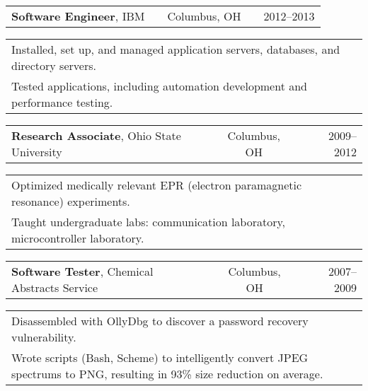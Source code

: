 \documentclass[12pt]{report}
\renewcommand{\bullet}{$\vcenter{\hbox{~\huge$\cdot$~}}$}
\begin{document}
\begin{tabularx}{\textwidth}{ @{} l X c X r @{} }
\textbf{Software Engineer}, IBM && Columbus, OH && 2012--2013 \\
\end{tabularx}
\begin{tabularx}{\textwidth}{ @{\bullet} X @{} }
Installed, set up, and managed application servers, databases, and directory servers. \\
Tested applications, including automation development and performance testing. \\
\end{tabularx}

\begin{tabularx}{\textwidth}{ @{} l X c X r @{} }
\textbf{Research Associate}, Ohio State University && Columbus, OH && 2009--2012 \\
\end{tabularx}
\begin{tabularx}{\textwidth}{ @{\bullet} X @{} }
Optimized medically relevant EPR (electron paramagnetic resonance) experiments. \\
Taught undergraduate labs: communication laboratory, microcontroller laboratory. \\
\end{tabularx}

\begin{tabularx}{\textwidth}{ @{} l X c X r @{} }
\textbf{Software Tester}, Chemical Abstracts Service && Columbus, OH && 2007--2009 \\
\end{tabularx}
\begin{tabularx}{\textwidth}{ @{\bullet} X @{} }
Disassembled with OllyDbg to discover a password recovery vulnerability. \\
Wrote scripts (Bash, Scheme) to intelligently convert JPEG spectrums to PNG, resulting in 93\% size reduction on average. \\
\end{tabularx}
\end{document}
